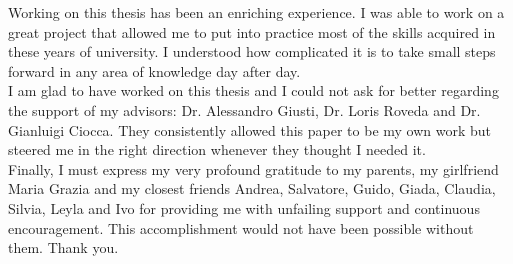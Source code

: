  
Working on this thesis has been an enriching experience. I was able to work on a great project that allowed me to put into practice most of the skills acquired in these years of university. I understood how complicated it is to take small steps forward in any area of knowledge day after day. \\

\noindent I am glad to have worked on this thesis and I could not ask for better regarding the support of my advisors: Dr. Alessandro Giusti, Dr. Loris Roveda and Dr. Gianluigi Ciocca. They consistently allowed this paper to be my own work but steered me in the right direction whenever they thought I needed it. \\

\noindent Finally, I must express my very profound gratitude to my parents, my girlfriend Maria Grazia and my closest friends Andrea, Salvatore, Guido, Giada, Claudia, Silvia, Leyla and Ivo for providing me with unfailing support and continuous encouragement. This accomplishment would not have been possible without them. Thank you.